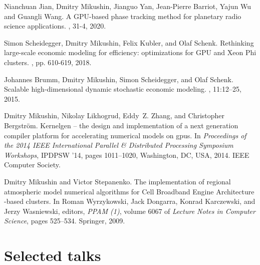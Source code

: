 \documentclass[a4paper]{moderncv}
\begin{document}
\begin{thebibliography}{1}

 Nianchuan Jian, Dmitry Mikushin, Jianguo Yan, Jean-Pierre Barriot, Yajun Wu and Guangli Wang.
\newblock A {GPU}-based phase tracking method for planetary radio science applications.
, 31-4, 2020.

 Simon Scheidegger, Dmitry Mikushin, Felix Kubler, and Olaf Schenk.
\newblock Rethinking large-scale economic modeling for efficiency: optimizations for GPU and Xeon Phi clusters.
, pp. 610-619, 2018.

Johannes Brumm, Dmitry Mikushin, Simon Scheidegger, and Olaf Schenk.
\newblock Scalable high-dimensional dynamic stochastic economic modeling.
, 11:12--25, 2015.

Dmitry Mikushin, Nikolay Likhogrud, Eddy~Z. Zhang, and Christopher
  Bergstr\"{o}m.
\newblock Kernelgen -- the design and implementation of a next generation
  compiler platform for accelerating numerical models on gpus.
\newblock In {\em Proceedings of the 2014 IEEE International Parallel \&
  Distributed Processing Symposium Workshops}, IPDPSW '14, pages 1011--1020,
  Washington, DC, USA, 2014. IEEE Computer Society.

Dmitry Mikushin and Victor Stepanenko.
\newblock The implementation of regional atmospheric model numerical algorithms
  for {Cell} {Broadband} {Engine} {Architecture} -based clusters.
\newblock In Roman Wyrzykowski, Jack Dongarra, Konrad Karczewski, and Jerzy
  Wasniewski, editors, {\em PPAM (1)}, volume 6067 of {\em Lecture Notes in
  Computer Science}, pages 525--534. Springer, 2009.

\end{thebibliography}

\section{Selected talks}
{\small
{}}
\end{document}
